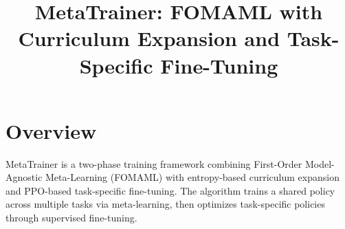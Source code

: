 \documentclass[11pt,a4paper]{article}
\title{MetaTrainer: FOMAML with Curriculum Expansion and Task-Specific Fine-Tuning}
\author{}
\date{}
\begin{document}
\maketitle

\section{Overview}

MetaTrainer is a two-phase training framework combining First-Order Model-Agnostic Meta-Learning (FOMAML) with entropy-based curriculum expansion and PPO-based task-specific fine-tuning. The algorithm trains a shared policy across multiple tasks via meta-learning, then optimizes task-specific policies through supervised fine-tuning.

\clearpage

\end{document}
